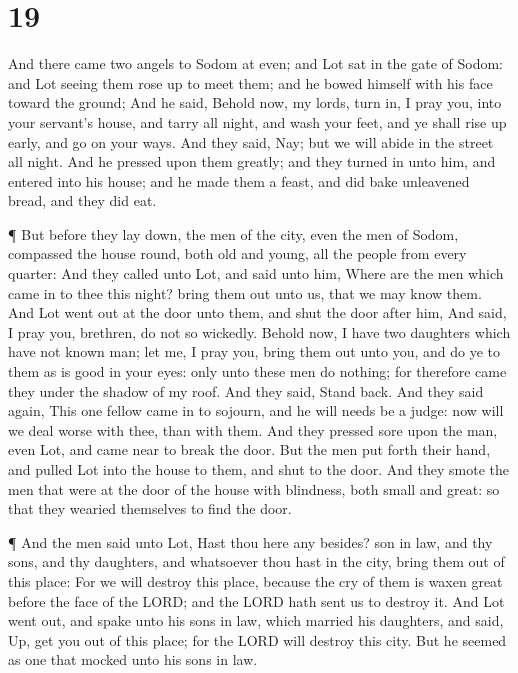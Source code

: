 \hypertarget{section-18}{%
\section{19}\label{section-18}}

 And there came two angels to Sodom at even; and Lot sat in
the gate of Sodom: and Lot seeing them rose up to meet them; and he
bowed himself with his face toward the ground;  And he said,
Behold now, my lords, turn in, I pray you, into your servant's house,
and tarry all night, and wash your feet, and ye shall rise up early, and
go on your ways. And they said, Nay; but we will abide in the street all
night.  And he pressed upon them greatly; and they turned in
unto him, and entered into his house; and he made them a feast, and did
bake unleavened bread, and they did eat.

 ¶ But before they lay down, the men of the city, even the
men of Sodom, compassed the house round, both old and young, all the
people from every quarter:  And they called unto Lot, and
said unto him, Where are the men which came in to thee this night? bring
them out unto us, that we may know them.  And Lot went out
at the door unto them, and shut the door after him,  And
said, I pray you, brethren, do not so wickedly.  Behold now,
I have two daughters which have not known man; let me, I pray you, bring
them out unto you, and do ye to them as is good in your eyes: only unto
these men do nothing; for therefore came they under the shadow of my
roof.  And they said, Stand back. And they said again, This
one fellow came in to sojourn, and he will needs be a judge: now will we
deal worse with thee, than with them. And they pressed sore upon the
man, even Lot, and came near to break the door.  But the
men put forth their hand, and pulled Lot into the house to them, and
shut to the door.  And they smote the men that were at the
door of the house with blindness, both small and great: so that they
wearied themselves to find the door.

 ¶ And the men said unto Lot, Hast thou here any besides?
son in law, and thy sons, and thy daughters, and whatsoever thou hast in
the city, bring them out of this place:  For we will
destroy this place, because the cry of them is waxen great before the
face of the LORD; and the LORD hath sent us to destroy it. 
And Lot went out, and spake unto his sons in law, which married his
daughters, and said, Up, get you out of this place; for the LORD will
destroy this city. But he seemed as one that mocked unto his sons in
law.

